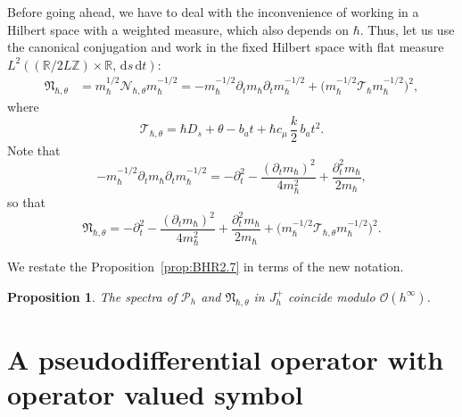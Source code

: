 \documentclass[10pt]{amsart}
\newcommand{\rd}{\,\mathrm{d}}
\newcommand{\cP}{\mathcal{P}}
\theoremstyle{plain}
\newtheorem{proposition}[theorem]{Proposition}
\theoremstyle{definition}
\newcommand{\R}{\mathbb{R}}
\newcommand{\Z}{\mathbb{Z}}
\begin{document}
Before going ahead, we have to deal with the inconvenience of working in a Hilbert space with a weighted measure, which also depends on $\hbar$. Thus, let us use the canonical conjugation and work in the fixed Hilbert space with flat measure
\hbox{$L^2((\R/2L\Z)\times\R,\rd s\rd t)$}:
\begin{equation}\label{eq:Nhc0}
\begin{aligned}
\mathfrak N_{\hbar,\theta}&=m_\hbar^{1/2}\mathcal N_{\hbar,\theta}m_\hbar^{-1/2}=-m^{-1/2}_{\hbar}\partial_t m_{\hbar}\partial_t m_{\hbar}^{-1/2}+\bigl(m_\hbar^{-1/2} \mathcal T_\hbar m_\hbar^{-1/2}\bigr)^2,
\end{aligned}
\end{equation}
where\vspace*{-3pt}
\begin{equation}\label{eq.Th}
\mathcal T_{\hbar,\theta}= \hbar D_s+\theta-b_at+\hbar c_\mu\,\frac{k}{2}\,b_at^2.
\end{equation}
Note that\vspace*{-3pt}
\begin{equation}\label{eq.transverse}
-m^{-1/2}_{\hbar}\partial_t m_{\hbar}\partial_t m_{\hbar}^{-1/2}=-\partial^2_t-\frac{(\partial_tm_\hbar)^2}{4m^2_\hbar}+\frac{\partial^2_tm_\hbar}{2m_\hbar},
\end{equation}
so that\vspace*{-3pt}
\begin{equation}\label{eq:Nhc}
\mathfrak N_{\hbar,\theta}=-\partial^2_t-\frac{(\partial_tm_\hbar)^2}{4m^2_\hbar}+\frac{\partial^2_tm_\hbar}{2m_\hbar}+\bigl(m_\hbar^{-1/2} \mathcal T_{\hbar,\theta} m_\hbar^{-1/2}\bigr)^2.
\end{equation}

We restate the Proposition~\ref{prop:BHR2.7} in terms of the new notation.
\begin{proposition}\label{prop:BHR2.7-bis}
The spectra of $\cP_h$ and $\mathfrak N_{\hbar,\theta}$ in $J^+_h$ coincide modulo $\mathcal{O}(h^{\infty})$.
\end{proposition}

\section{A pseudodifferential operator with operator valued symbol}\label{sec:pseudo}
\end{document}
